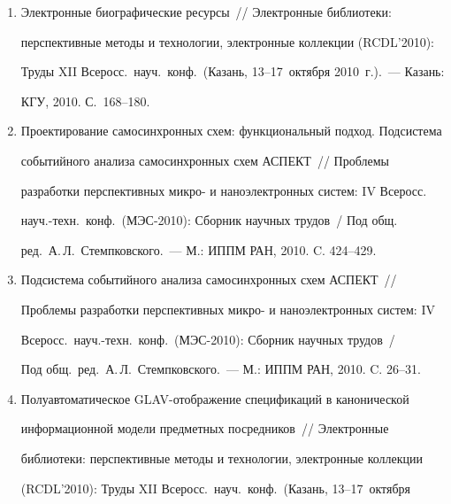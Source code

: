 \begin{enumerate}[1.]
Компьютерная лингвистика и интеллектуальные технологии: По мат-лам 


ежегодной Междунар.\ конф.\ <<Диалог>> (Бекасово, 26--30~мая 


2010~г.). Вып.~9(16).~--- М.: РГГУ, 2010. С.~254--264.


\item {}


Электронные биографические ресурсы~/\!\!/  Электронные библиотеки: 


перспективные методы и технологии, электронные коллекции (RCDL'2010): 


Труды XII Всеросс.\ науч.\ конф.\ (Казань, 13--17~октября 2010~г.).~--- Казань: 


КГУ, 2010. С.~168--180.


\item {}


Проектирование самосинхронных схем: функциональный подход. Подсис\-тема 


событийного анализа самосинхронных схем АСПЕКТ~/\!\!/  Проблемы 


разработки перспективных микро- и наноэлектронных сис\-тем: IV Всеросс.\ 


науч.-техн.\ конф.\ (МЭС-2010): Сборник научных трудов~/ Под общ.\ 


ред.\ А.\,Л.~Стемпковского.~--- М.: ИППМ РАН, 2010. C. 424--429.


\item {}


Под\-сис\-те\-ма событийного анализа самосинхронных схем АСПЕКТ~/\!\!/  


Проблемы разработки перспективных микро- и наноэлектронных сис\-тем: IV 


Всеросс.\ науч.-техн.\ конф.\ (МЭС-2010): Сборник научных трудов~/ 


Под общ.\ ред.\ А.\,Л.~Стемпковского.~--- М.: ИППМ РАН, 2010. C. 26--31.


\item {}


Полуавтоматическое GLAV-отображение спецификаций в канонической 


информационной модели предметных посредников~/\!\!/  Электронные 


библиотеки: перспективные методы и технологии, электронные коллекции 


(RCDL'2010): Труды XII Всеросс.\ науч.\ конф.\ (Казань, 13--17~октября 



\end{enumerate}
